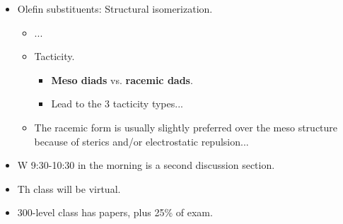 \documentclass[../notes.tex]{subfiles}
\begin{document}
\begin{itemize}
\begin{itemize}
\begin{itemize}
        \end{itemize}
    \end{itemize}
    \item Olefin substituents: Structural isomerization.
    \begin{itemize}
        \item ...
        \item Tacticity.
        \begin{itemize}
            \item \textbf{Meso diads} vs. \textbf{racemic dads}.
            \item Lead to the 3 tacticity types...
        \end{itemize}
        \item The racemic form is usually slightly preferred over the meso structure because of sterics and/or electrostatic repulsion...
    \end{itemize}
    \item W 9:30-10:30 in the morning is a second discussion section.
    \item Th class will be virtual.
    \item 300-level class has papers, plus 25\% of exam.
\end{itemize}
\end{document}
